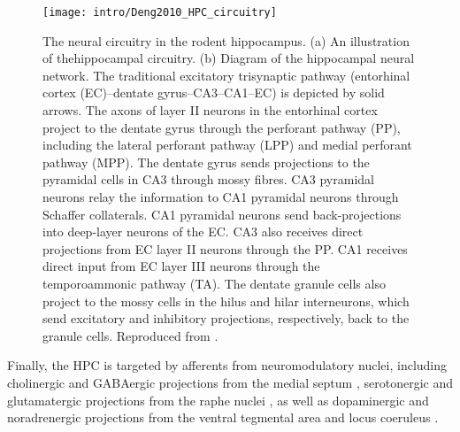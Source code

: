 \begin{figure}
	\centering
	\texttt{[image: intro/Deng2010\_HPC\_circuitry]}
	\caption[The neural circuitry in the rodent hippocampus]{The neural circuitry in the rodent hippocampus.
	(a) An illustration of thehippocampal circuitry.
	(b) Diagram of the hippocampal neural network. The traditional excitatory trisynaptic pathway (entorhinal cortex (EC)--dentate gyrus--CA3--CA1--EC) is depicted by solid arrows. The axons of layer II neurons in the entorhinal cortex project to the dentate gyrus through the perforant pathway (PP), including the lateral perforant pathway (LPP) and medial perforant pathway (MPP). The dentate gyrus sends projections to the pyramidal cells in CA3 through mossy fibres. CA3 pyramidal neurons relay the information to CA1 pyramidal neurons through Schaffer collaterals. CA1 pyramidal neurons send back-projections into deep-layer neurons of the EC. CA3 also receives direct projections from EC layer II neurons through the PP. CA1 receives direct input from EC layer III neurons through the temporoammonic pathway (TA). The dentate granule cells also project to the mossy cells in the hilus and hilar interneurons, which send excitatory and inhibitory projections, respectively, back to the granule cells. 
	Reproduced from \citet{Deng2010}.}
	\label{fig:intro:memory:HPC_circuitry}
\end{figure}


Finally, the \ac{HPC} is targeted by afferents from neuromodulatory nuclei, including cholinergic and GABAergic projections from the medial septum  \citep{Klausberger2008}, serotonergic and glutamatergic projections from the raphe nuclei \citep{Varga2009}, as well as dopaminergic and noradrenergic projections from the ventral tegmental area \citep{Gasbarri1997} and locus coeruleus \citep{Foote1983}.


